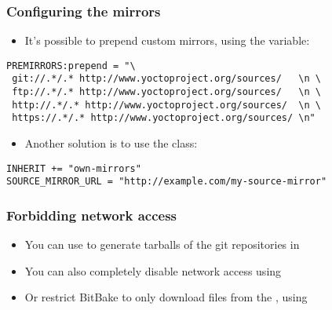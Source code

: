 \begin{frame}[fragile]
  \frametitle{Configuring the mirrors}
  \begin{itemize}
    \item It's possible to prepend custom mirrors, using the
       variable:
  \end{itemize}
  \begin{block}{}
    \begin{verbatim}
PREMIRRORS:prepend = "\
 git://.*/.* http://www.yoctoproject.org/sources/   \n \
 ftp://.*/.* http://www.yoctoproject.org/sources/   \n \
 http://.*/.* http://www.yoctoproject.org/sources/  \n \
 https://.*/.* http://www.yoctoproject.org/sources/ \n"
    \end{verbatim}
  \end{block}
  \begin{itemize}
    \item Another solution is to use the  class:
  \end{itemize}
  \begin{block}{}
    \begin{verbatim}
INHERIT += "own-mirrors"
SOURCE_MIRROR_URL = "http://example.com/my-source-mirror"
    \end{verbatim}
  \end{block}
\end{frame}

\begin{frame}[fragile]
  \frametitle{Forbidding network access}
  \begin{itemize}
    \item You can use  to
      generate tarballs of the git repositories in 
    \item You can also completely disable network access using
    \item Or restrict BitBake to only download files from the
      \code{PREMIRRORS}, using 
  \end{itemize}
\end{frame}
